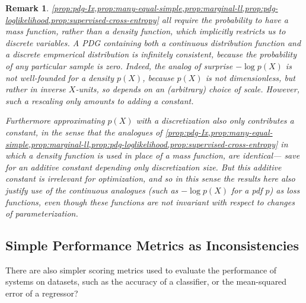 \documentclass{article}
\theoremstyle{plain}
\newtheorem{remark}{Remark}
\theoremstyle{definition}
\begin{document}
\begin{remark} \label{remark:continuous}
\cref{prop:pdg-Ix,prop:many-equal-simple,prop:marginal-ll,prop:pdg-loglikelihood,prop:supervised-cross-entropy} all require the probability to have a mass function, rather than a density function, which implicitly restricts us to discrete variables. 
A PDG containing both a continuous distribution function and a discrete empmerical distribution is infinitely consistent, because the probability of any particular sample is zero.
Indeed, the analog of surprise $-\log p(X)$ is not well-founded for a density $p(X)$, because $p(X)$ is not dimensionless, but rather in inverse $X$-units, so depends on an (arbitrary) choice of scale.
However, such a rescaling only amounts to adding a constant.

Furthermore approximating $p(X)$ with a discretization also only contributes a constant, in the sense that the analogues of \cref{prop:pdg-Ix,prop:many-equal-simple,prop:marginal-ll,prop:pdg-loglikelihood,prop:supervised-cross-entropy} in which a density function is used in place of a mass function, are identical--- save for an additive constant depending only discretization size.
But this additive constant is irrelevant for optimization, 
and so in this sense the results here also justify use of the continuous analogues (such as $- \log p(X)$ for a pdf $p$) as loss functions, even though these functions are not invariant with respect to changes of parameterization.
\end{remark}

\subsection{Simple Performance Metrics as Inconsistencies}

There are also simpler scoring metrics used to evaluate the performance of systems on datasets, such as the accuracy of a  classifier, or the mean-squared error of a regressor?
\end{document}
